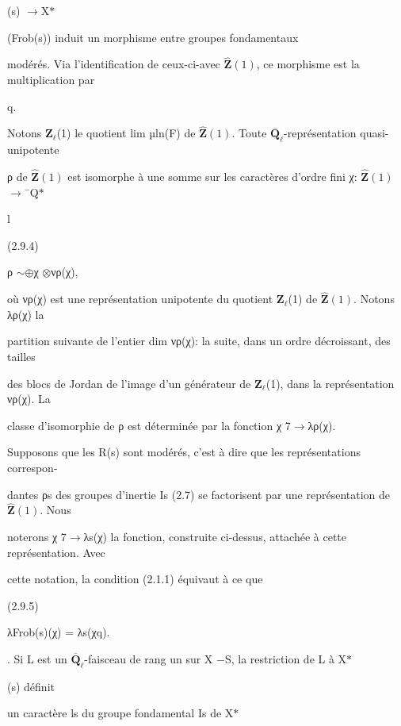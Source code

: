 \documentclass[11pt]{article}
\begin{document}
\noindent (s) \(\to\)X\(*\)\par
\noindent (Frob(s)) induit un morphisme entre groupes fondamentaux\par
\noindent modérés. Via l’identification de ceux-ci-avec \(\widehat{\mathbf Z}(1)\), ce morphisme est la multiplication par\par
\noindent q.\par
\medskip
\noindent Notons \(\mathbf Z_{\ell}\)(1) le quotient lim µln(F) de \(\widehat{\mathbf Z}(1)\). Toute \(\overline{\mathbf Q}_{\ell}\)-représentation quasi-unipotente\par
\noindent ρ de \(\widehat{\mathbf Z}(1)\) est isomorphe à une somme sur les caractères d’ordre fini χ: \(\widehat{\mathbf Z}(1)\) \(\to\)¯Q\(*\)\par
\noindent l\par
\noindent (2.9.4)\par
\noindent ρ \(\sim\)\(\oplus\)χ \(\otimes\)νρ(χ),\par
\noindent où νρ(χ) est une représentation unipotente du quotient \(\mathbf Z_{\ell}\)(1) de \(\widehat{\mathbf Z}(1)\). Notons λρ(χ) la\par
\noindent partition suivante de l’entier dim νρ(χ): la suite, dans un ordre décroissant, des tailles\par
\noindent des blocs de Jordan de l’image d’un générateur de \(\mathbf Z_{\ell}\)(1), dans la représentation νρ(χ). La\par
\noindent classe d’isomorphie de ρ est déterminée par la fonction χ 7\(\to\)λρ(χ).\par
\noindent Supposons que les R(s) sont modérés, c’est à dire que les représentations correspon-\par
\noindent dantes ρs des groupes d’inertie Is (2.7) se factorisent par une représentation de \(\widehat{\mathbf Z}(1)\). Nous\par
\noindent noterons χ 7\(\to\)λs(χ) la fonction, construite ci-dessus, attachée à cette représentation. Avec\par
\noindent cette notation, la condition (2.1.1) équivaut à ce que\par
\noindent (2.9.5)\par
\noindent λFrob(s)(χ) = λs(χq).\par
{}. Si L est un \(\overline{\mathbf Q}_{\ell}\)-faisceau de rang un sur X −S, la restriction de L à X\(*\)\par
\noindent (s) définit\par
\noindent un caractère ls du groupe fondamental Is de X\(*\)\par
\end{document}
